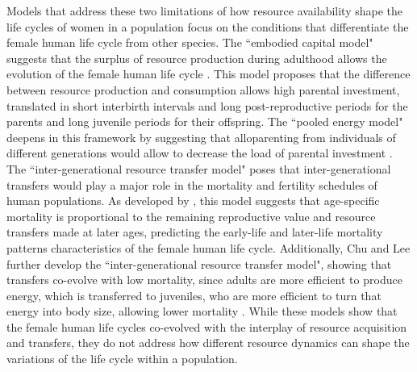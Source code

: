 \documentclass{article}
\begin{document}
Models that address these two limitations of how resource availability shape the life cycles of women in a population focus on the conditions that differentiate the female human life cycle from other species. The ``embodied capital model" suggests that the surplus of resource production during adulthood allows the evolution of the female human life cycle \citep{kaplan2000theory}. This model proposes that the difference between resource production and consumption allows high parental investment, translated in short interbirth intervals and long post-reproductive periods for the parents and long juvenile periods for their offspring. The ``pooled energy model" deepens in this framework by suggesting that alloparenting from individuals of different generations would allow to decrease the load of parental investment \citep{kramer2010pooled}. The ``inter-generational resource transfer model" poses that inter-generational transfers would play a major role in the mortality and fertility schedules of human populations. As developed by \cite{lee2003rethinking}, this model suggests that age-specific mortality is proportional to the remaining reproductive value and resource transfers made at later ages, predicting the early-life and later-life mortality patterns characteristics of the female human life cycle. Additionally, Chu and Lee further develop the ``inter-generational resource transfer model", showing that transfers co-evolve with low mortality, since adults are more efficient to produce energy, which is transferred to juveniles, who are more efficient to turn that energy into body size, allowing lower mortality \citep{chu2006co}. While these models show that the female human life cycles co-evolved with the interplay of resource acquisition and transfers, they do not address how different resource dynamics can shape the variations of the life cycle within a population.
\end{document}
